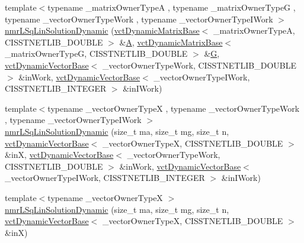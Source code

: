 \begin{DoxyCompactItemize}
{\footnotesize template$<$typename \-\_\-matrix\-Owner\-Type\-A , typename \-\_\-matrix\-Owner\-Type\-G , typename \-\_\-vector\-Owner\-Type\-Work , typename \-\_\-vector\-Owner\-Type\-I\-Work $>$ }\\\hyperlink{classnmr_l_sq_lin_solution_dynamic_a1b98a788d3543acaa6e223dfdb0b32d7}{nmr\-L\-Sq\-Lin\-Solution\-Dynamic} (\hyperlink{classvct_dynamic_matrix_base}{vct\-Dynamic\-Matrix\-Base}$<$ \-\_\-matrix\-Owner\-Type\-A, C\-I\-S\-S\-T\-N\-E\-T\-L\-I\-B\-\_\-\-D\-O\-U\-B\-L\-E $>$ \&\hyperlink{classnmr_l_sq_lin_solution_dynamic_aa4a41abac141e2e55dd5cafb59169dfd}{A}, \hyperlink{classvct_dynamic_matrix_base}{vct\-Dynamic\-Matrix\-Base}$<$ \-\_\-matrix\-Owner\-Type\-G, C\-I\-S\-S\-T\-N\-E\-T\-L\-I\-B\-\_\-\-D\-O\-U\-B\-L\-E $>$ \&\hyperlink{classnmr_l_sq_lin_solution_dynamic_a399cb314fb848d36f58c14830bad0c28}{G}, \hyperlink{classvct_dynamic_vector_base}{vct\-Dynamic\-Vector\-Base}$<$ \-\_\-vector\-Owner\-Type\-Work, C\-I\-S\-S\-T\-N\-E\-T\-L\-I\-B\-\_\-\-D\-O\-U\-B\-L\-E $>$ \&in\-Work, \hyperlink{classvct_dynamic_vector_base}{vct\-Dynamic\-Vector\-Base}$<$ \-\_\-vector\-Owner\-Type\-I\-Work, C\-I\-S\-S\-T\-N\-E\-T\-L\-I\-B\-\_\-\-I\-N\-T\-E\-G\-E\-R $>$ \&in\-I\-Work)
\item 
{\footnotesize template$<$typename \-\_\-vector\-Owner\-Type\-X , typename \-\_\-vector\-Owner\-Type\-Work , typename \-\_\-vector\-Owner\-Type\-I\-Work $>$ }\\\hyperlink{classnmr_l_sq_lin_solution_dynamic_a503db90420caca72cbe65b6d1c6867b0}{nmr\-L\-Sq\-Lin\-Solution\-Dynamic} (size\-\_\-t ma, size\-\_\-t mg, size\-\_\-t n, \hyperlink{classvct_dynamic_vector_base}{vct\-Dynamic\-Vector\-Base}$<$ \-\_\-vector\-Owner\-Type\-X, C\-I\-S\-S\-T\-N\-E\-T\-L\-I\-B\-\_\-\-D\-O\-U\-B\-L\-E $>$ \&in\-X, \hyperlink{classvct_dynamic_vector_base}{vct\-Dynamic\-Vector\-Base}$<$ \-\_\-vector\-Owner\-Type\-Work, C\-I\-S\-S\-T\-N\-E\-T\-L\-I\-B\-\_\-\-D\-O\-U\-B\-L\-E $>$ \&in\-Work, \hyperlink{classvct_dynamic_vector_base}{vct\-Dynamic\-Vector\-Base}$<$ \-\_\-vector\-Owner\-Type\-I\-Work, C\-I\-S\-S\-T\-N\-E\-T\-L\-I\-B\-\_\-\-I\-N\-T\-E\-G\-E\-R $>$ \&in\-I\-Work)
\item 
{\footnotesize template$<$typename \-\_\-vector\-Owner\-Type\-X $>$ }\\\hyperlink{classnmr_l_sq_lin_solution_dynamic_a9feee0225e0ee431c13d4cde3d7895b2}{nmr\-L\-Sq\-Lin\-Solution\-Dynamic} (size\-\_\-t ma, size\-\_\-t mg, size\-\_\-t n, \hyperlink{classvct_dynamic_vector_base}{vct\-Dynamic\-Vector\-Base}$<$ \-\_\-vector\-Owner\-Type\-X, C\-I\-S\-S\-T\-N\-E\-T\-L\-I\-B\-\_\-\-D\-O\-U\-B\-L\-E $>$ \&in\-X)

\end{DoxyCompactItemize}
